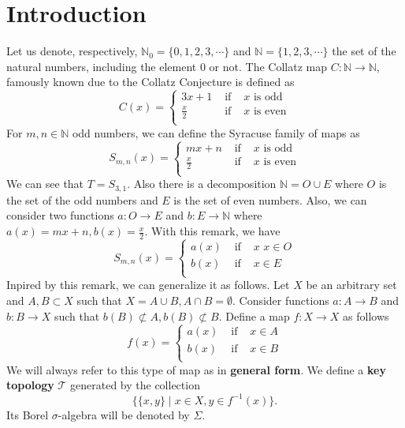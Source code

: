 \documentclass[12 pt]{amsart}
\theoremstyle{definition}
\begin{document}
	\section{Introduction}
	Let us denote, respectively, $\mathbb{N}_{0} = \{0, 1, 2, 3, \cdots\}$ and $\mathbb{N} = \{1, 2, 3, \cdots\}$ the set of the natural numbers, including the element $0$ or not. The Collatz map $C: \mathbb{N} \to \mathbb{N}$, famously known due to the Collatz Conjecture is defined as
	\[
	C(x) =
	\left\{
	\begin{array}{ccc}
		3x + 1 \,\, &\text{if}& \,\, x \,\, \text{is odd} \\
		\frac{x}{2} \,\, &\text{if}& \,\, x \,\, \text{is even} \\
	\end{array}
	\right.
	\]
	For $m, n \in \mathbb{N}$ odd numbers, we can define the Syracuse family of maps as
	\[
	S_{m,n}(x) =
	\left\{
	\begin{array}{ccc}
		mx + n \,\, &\text{if}& \,\, x \,\, \text{is odd} \\
		\frac{x}{2} \,\, &\text{if}& \,\, x \,\, \text{is even} \\
	\end{array}
	\right.
	\]
	We can see that $T = S_{3,1}$. Also there is a decomposition $\mathbb{N} = O \cup E$ where $O$ is the set of the odd numbers and $E$ is the set of even numbers. Also, we can consider two functions $a : O \to E$ and $b: E \to \mathbb{N}$ where $a(x) = mx + n, b(x) = \frac{x}{2}$. With this remark, we have
	\[
	S_{m,n}(x) =
	\left\{
	\begin{array}{ccc}
		a(x) \,\, &\text{if}& \,\, x \,\, x \in O \\
		b(x)\,\, &\text{if}& \,\, x \in E \\
	\end{array}
	\right.
	\]
	Inpired by this remark, we can generalize it as follows. Let $X$ be an arbitrary set and $A, B \subset X$ such that $X = A \cup B, A \cap B = \emptyset$. Consider functions $a : A \to B$ and $b : B \to X$ such that $b(B) \not \subset A, b(B) \not \subset B$. Define a map $f : X \to X$ as follows
	\[
	f(x) =
	\left\{
	\begin{array}{ccc}
		a(x) \,\, &\text{if}& \,\, x \in A \\
		b(x) \,\, &\text{if}& \,\, x \in B \\
	\end{array}
	\right.
	\] 
	We will always refer to this type of map as in \textbf{general form}. We define a \textbf{key topology} $\mathcal{T}$ generated by the collection
	\[
	\{ \{x, y\}  \mid x \in X, y \in f^{-1}(x)\}.
	\]
	Its Borel $\sigma$-algebra will be denoted by $\Sigma$.
	
\end{document}

